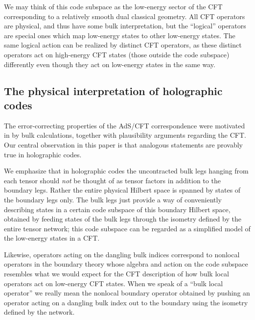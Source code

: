 \documentclass[12pt]{article}
\theoremstyle{plain}
\theoremstyle{plain}
\theoremstyle{plain}
\theoremstyle{plain}
\theoremstyle{result}
\theoremstyle{remark}
\theoremstyle{conjecture}
\theoremstyle{observation}
\theoremstyle{definition}
\theoremstyle{corollary}
\theoremstyle{definition}
\theoremstyle{definition}
\theoremstyle{assumption}
\theoremstyle{definition}
\theoremstyle{problem}
\theoremstyle{fact}
\begin{document}
We may think of this code subspace as the low-energy sector of the CFT corresponding to a relatively smooth dual classical geometry. All CFT operators are physical, and thus have some bulk interpretation, but the ``logical'' operators are special ones which map low-energy states to other low-energy states. The same logical action can be realized by distinct CFT operators, as these distinct operators act on high-energy CFT states (those outside the code subspace) differently even though they act on low-energy states in the same way. 

\subsection{The physical interpretation of holographic codes}

The error-correcting properties of the AdS/CFT correspondence were motivated in \cite{Almheiri14} by bulk calculations, together with plausibility arguments regarding the CFT.  Our central observation in this paper is that analogous statements are provably true in holographic codes.

We emphasize that in holographic codes the uncontracted bulk legs hanging from each tensor should \textit{not} be thought of as tensor factors in addition to the boundary legs.  Rather the entire physical Hilbert space is spanned by states of the boundary legs only. The bulk legs just provide a way of conveniently describing states in a certain code subspace of this boundary Hilbert space, obtained by feeding states of the bulk legs through the isometry defined by the entire tensor network; this code subspace can be regarded as a simplified model of the low-energy states in a CFT.  

Likewise, operators acting on the dangling bulk indices correspond to nonlocal operators in the boundary theory whose algebra and action on the code subspace resembles what we would expect for the CFT description of how bulk local operators act on low-energy CFT states. When we speak of a ``bulk local operator'' we really mean the nonlocal boundary operator obtained by pushing an operator acting on a dangling bulk index out to the boundary using the isometry defined by the network.
\end{document}
